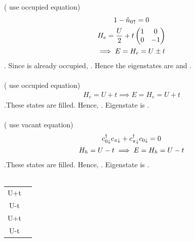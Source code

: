 \documentclass[12pt]{article}
\begin{document}
\subsection{}
 ( use occupied equation)
\begin{gather}
1-\hat n_{0\uparrow} = 0\\
	H_e = \frac{U}{2} + t\begin{pmatrix} 1 & 0 \\ 0 & -1 \end{pmatrix}\\
	\implies E = H_e = U \pm t
\end{gather}
. Since \il{0\ua} is already occupied, . Hence the eigenstates are \il{\ket{\ua\da,\ua}} and \il{\ket{\ua,\ua\da}}.\\\\
 ( use occupied equation)
\begin{gather}
H_e = U+t
\implies E = H_e = U+t
\end{gather}
.These states are filled. Hence, . Eigenstate is \il{\ket{\ua\da,\da}}.\\\\
 ( use vacant equation)
\begin{gather}
c^\dagger_{0\downarrow}c_{\pi\downarrow}+c^\dagger_{\pi\downarrow}c_{0\downarrow}=0\\
H_h = U-t	
\implies E = H_h = U - t
\end{gather}
.These states are filled. Hence, . Eigenstate is \il{\ket{\da,\ua\da}}.\\\\

\begin{table}[tbh!]
	\begin{center}
	\begin{tabular}{|c|c|}
		\hline
		U+t  & \il{\ket{\ua\da,\ua}}\\
		U-t  & \il{\ket{\ua,\ua\da}}\\
		U+t  & \il{\ket{\ua\da,\da}}\\
		U-t  & \il{\ket{\da,\ua\ua}}\\
		\hline
	\end{tabular}
	\end{center}
\end{table}
\end{document}

